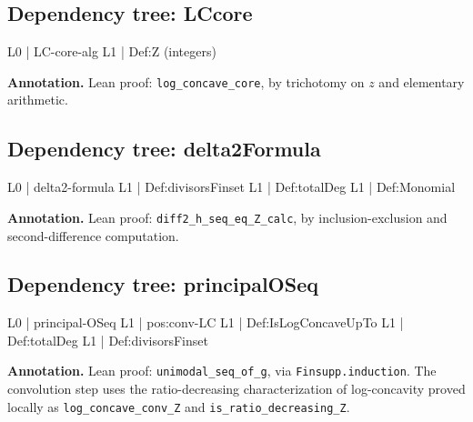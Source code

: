 \documentclass[11pt,reqno]{amsart}
\begin{document}
\medskip

\subsection*{Dependency tree: \textsf{LCcore}}

\noindent%
\begin{minipage}[t]{0.48\linewidth}
	\vspace{0pt}
	\begin{verbatimbox}
		L0 | LC-core-alg
		L1 |   Def:Z (integers)
	\end{verbatimbox}
\end{minipage}\hfill 
\begin{minipage}[t]{0.48\linewidth}
	\vspace{0pt}
	\textbf{Annotation.} Lean proof: \texttt{log\_concave\_core}, by trichotomy on $z$ and elementary arithmetic.
\end{minipage}

\medskip

\subsection*{Dependency tree: \textsf{delta2Formula}}

\noindent%
\begin{minipage}[t]{0.48\linewidth}
	\vspace{0pt}
	\begin{verbatimbox}
		L0 | delta2-formula
		L1 |   Def:divisorsFinset
		L1 |   Def:totalDeg
		L1 |   Def:Monomial
	\end{verbatimbox}
\end{minipage}\hfill 
\begin{minipage}[t]{0.48\linewidth}
	\vspace{0pt}
	\textbf{Annotation.} Lean proof: \texttt{diff2\_h\_seq\_eq\_Z\_calc}, by inclusion-exclusion and second-difference computation.
\end{minipage}

\medskip

\subsection*{Dependency tree: \textsf{principalOSeq}}

\noindent%
\begin{minipage}[t]{0.48\linewidth}
	\vspace{0pt}
	\begin{verbatimbox}
		L0 | principal-OSeq
		L1 |   pos:conv-LC
		L1 |   Def:IsLogConcaveUpTo
		L1 |   Def:totalDeg
		L1 |   Def:divisorsFinset
	\end{verbatimbox}
\end{minipage}\hfill 
\begin{minipage}[t]{0.48\linewidth}
	\vspace{0pt}
	\textbf{Annotation.} Lean proof: \texttt{unimodal\_seq\_of\_g}, via \texttt{Finsupp.induction}. The convolution step uses the ratio-decreasing characterization of log-concavity proved locally as \texttt{log\_concave\_conv\_Z} and \texttt{is\_ratio\_decreasing\_Z}.
\end{minipage}
\end{document}
